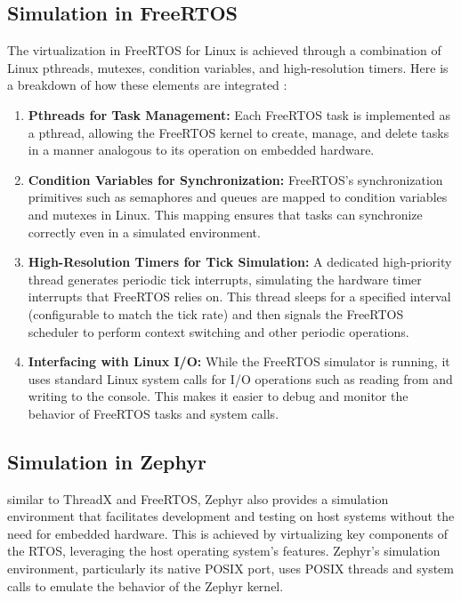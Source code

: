 \subsection{Simulation in FreeRTOS}
The virtualization in FreeRTOS for Linux is achieved through a combination of Linux pthreads, mutexes, condition variables, and high-resolution timers. Here is a breakdown of how these elements are integrated \cite{freertos_simulator}:
\begin{enumerate}
\item \textbf{Pthreads for Task Management: }
Each FreeRTOS task is implemented as a pthread, allowing the FreeRTOS kernel to create, manage, and delete tasks in a manner analogous to its operation on embedded hardware.
\item \textbf{Condition Variables for Synchronization: }
FreeRTOS's synchronization primitives such as semaphores and queues are mapped to condition variables and mutexes in Linux. This mapping ensures that tasks can synchronize correctly even in a simulated environment.
\item \textbf{High-Resolution Timers for Tick Simulation: }
A dedicated high-priority thread generates periodic tick interrupts, simulating the hardware timer interrupts that FreeRTOS relies on. This thread sleeps for a specified interval (configurable to match the tick rate) and then signals the FreeRTOS scheduler to perform context switching and other periodic operations.
\item \textbf{Interfacing with Linux I/O: }
While the FreeRTOS simulator is running, it uses standard Linux system calls for I/O operations such as reading from and writing to the console. This makes it easier to debug and monitor the behavior of FreeRTOS tasks and system calls.
\end{enumerate}

\subsection{Simulation in Zephyr}
similar to ThreadX and FreeRTOS, Zephyr also provides a simulation environment that facilitates development and testing on host systems without the need for embedded hardware. This is achieved by virtualizing key components of the RTOS, leveraging the host operating system's features. Zephyr's simulation environment, particularly its native POSIX port, uses POSIX threads and system calls to emulate the behavior of the Zephyr kernel. \cite{zephyr_native_simulator}

